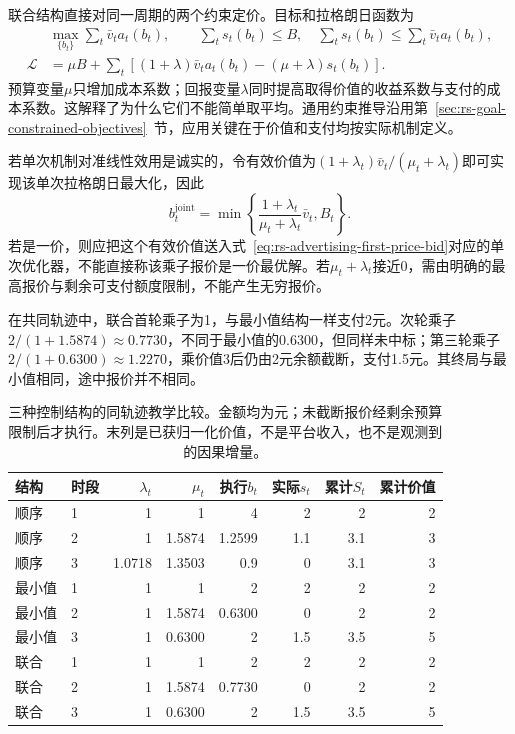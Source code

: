 联合结构直接对同一周期的两个约束定价。目标和拉格朗日函数为
\begin{equation}
  \begin{aligned}
    &\max_{\{b_t\}}\sum_t\bar v_ta_t(b_t),\qquad
      \sum_ts_t(b_t)\leq B,\quad
      \sum_ts_t(b_t)\leq\sum_t\bar v_ta_t(b_t),\\
    \mathcal{L}
      &=\mu B+\sum_t
        \left[(1+\lambda)\bar v_ta_t(b_t)
          -(\mu+\lambda)s_t(b_t)\right].
  \end{aligned}
  \label{eq:rs-advertising-joint-objective}
\end{equation}
预算变量$\mu$只增加成本系数；回报变量$\lambda$同时提高取得价值的收益系数与支付的成本系数。这解释了为什么它们不能简单取平均。通用约束推导沿用第~\ref{sec:rs-goal-constrained-objectives}~节，应用关键在于价值和支付均按实际机制定义。

若单次机制对准线性效用是诚实的，令有效价值为$(1+\lambda_t)\bar v_t/(\mu_t+\lambda_t)$即可实现该单次拉格朗日最大化，因此
\begin{equation}
  b_t^{\mathrm{joint}}
    =\min\!\left\{
       \frac{1+\lambda_t}{\mu_t+\lambda_t}\bar v_t,
       B_t\right\}.
  \label{eq:rs-advertising-joint-pacing}
\end{equation}
若是一价，则应把这个有效价值送入式~\eqref{eq:rs-advertising-first-price-bid}对应的单次优化器，不能直接称该乘子报价是一价最优解。若$\mu_t+\lambda_t$接近0，需由明确的最高报价与剩余可支付额度限制，不能产生无穷报价。

在共同轨迹中，联合首轮乘子为1，与最小值结构一样支付2元。次轮乘子$2/(1+1.5874)\approx0.7730$，不同于最小值的0.6300，但同样未中标；第三轮乘子$2/(1+0.6300)\approx1.2270$，乘价值3后仍由2元余额截断，支付1.5元。其终局与最小值相同，途中报价并不相同。

\begin{table}[htbp]
  \centering
  \small
  \begin{tabular}{@{}llrrrrrr@{}}
    \toprule
    结构 & 时段 & $\lambda_t$ & $\mu_t$ & 执行$b_t$ & 实际$s_t$ & 累计$S_t$ & 累计价值\\
    \midrule
    顺序 & 1 & 1 & 1 & 4 & 2 & 2 & 2\\
    顺序 & 2 & 1 & 1.5874 & 1.2599 & 1.1 & 3.1 & 3\\
    顺序 & 3 & 1.0718 & 1.3503 & 0.9 & 0 & 3.1 & 3\\
    最小值 & 1 & 1 & 1 & 2 & 2 & 2 & 2\\
    最小值 & 2 & 1 & 1.5874 & 0.6300 & 0 & 2 & 2\\
    最小值 & 3 & 1 & 0.6300 & 2 & 1.5 & 3.5 & 5\\
    联合 & 1 & 1 & 1 & 2 & 2 & 2 & 2\\
    联合 & 2 & 1 & 1.5874 & 0.7730 & 0 & 2 & 2\\
    联合 & 3 & 1 & 0.6300 & 2 & 1.5 & 3.5 & 5\\
    \bottomrule
  \end{tabular}
  \caption{三种控制结构的同轨迹教学比较。金额均为元；未截断报价经剩余预算限制后才执行。末列是已获归一化价值，不是平台收入，也不是观测到的因果增量。}
  \label{tab:rs-advertising-pacing-comparison}
\end{table}

